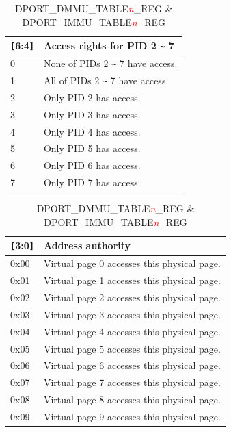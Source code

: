 \begin{table}[H]
    \centering
    \caption{DPORT\_DMMU\_TABLE\textcolor{red}{\it{n}}\_REG \& DPORT\_IMMU\_TABLE\textcolor{red}{\it{n}}\_REG}
    \label{table:DPORT_DMMU_IMMU_TABLEn_REG}
    \begin{tabular}[t]{|p{1cm}|p{5cm}|}
        \hline
        \rowcolor{lightgray}
        \verb+[+6:4\verb+]+ & Access rights for PID 2 \verb+~+ 7 \\
        \hline
        0 & None of PIDs 2 \verb+~+ 7 have access. \\
        \hline
        1 & All of PIDs 2 \verb+~+ 7 have access. \\
        \hline
        2 & Only PID 2 has access. \\
        \hline
        3 & Only PID 3 has access. \\
        \hline
        4 & Only PID 4 has access. \\
        \hline
        5 & Only PID 5 has access. \\
        \hline
        6 & Only PID 6 has access. \\
        \hline
        7 & Only PID 7 has access. \\
        \hline
    \end{tabular}
   \begin{tabular}[t]{|p{1cm}|p{7cm}|}
        \hline
        \rowcolor{lightgray}
        \verb+[+3:0\verb+]+ & Address authority \\
        \hline
        0x00 & Virtual page 0 accesses this physical page. \\
        \hline
        0x01 & Virtual page 1 accesses this physical page. \\
        \hline
        0x02 & Virtual page 2 accesses this physical page. \\
        \hline
        0x03 & Virtual page 3 accesses this physical page. \\
        \hline
        0x04 & Virtual page 4 accesses this physical page. \\
        \hline
        0x05 & Virtual page 5 accesses this physical page. \\
        \hline
        0x06 & Virtual page 6 accesses this physical page. \\
        \hline
        0x07 & Virtual page 7 accesses this physical page. \\
        \hline
        0x08 & Virtual page 8 accesses this physical page. \\
        \hline
        0x09 & Virtual page 9 accesses this physical page. \\

\end{tabular}
\end{table}
